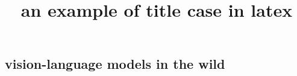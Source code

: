 \documentclass{article}
\title{an example of title case in latex}
\author{}
\date{}
\begin{document}
\begin{preview}
  \setcounter{secnumdepth}{0}
  \maketitle
  \section{vision-language models in the wild}
\end{preview}
\end{document}
